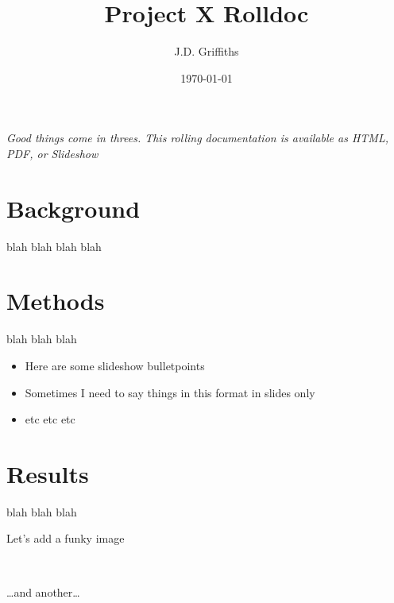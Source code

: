 \documentclass{report}
\title{Project X Rolldoc}
\date{\today}
\author{J.D. Griffiths}
\begin{document}
    
    
    
    \maketitle
    
    
    \tableofcontents


    
    \emph{Good things come in threes. This rolling documentation is
available as HTML, PDF, or Slideshow}


    \section{Background}


    blah blah blah blah


    \section{Methods}


    blah blah blah

    \begin{itemize}
\item
  Here are some slideshow bulletpoints
\item
  Sometimes I need to say things in this format in slides only
\item
  etc etc etc
\end{itemize}


    \section{Results}


    blah blah blah

    Let's add a funky image



    
    \begin{center}
    \end{center}
    { \hspace*{\fill} \\}
    

    \ldots{}and another\ldots{}


    
    \begin{center}
    \end{center}
    { \hspace*{\fill} \\}
    
\end{document}
